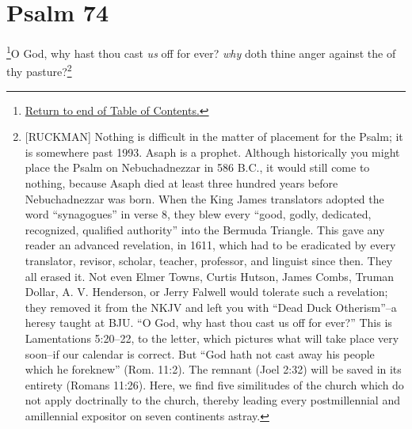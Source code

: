 \chapter{Psalm 74}
\footnote{\textcolor[rgb]{0.00,0.25,0.00}{\hyperlink{TOC}{Return to end of Table of Contents.}}}\textcolor[rgb]{0.00,0.00,1.00}{O God, why hast thou cast \emph{us} off for ever? \emph{why} doth thine anger  against the  of thy pasture?}\footnote{[RUCKMAN] Nothing is difficult in the matter of placement for the Psalm; it is somewhere past 1993. Asaph is a prophet. Although historically you might place the Psalm on Nebuchadnezzar in 586 B.C., it would still come to nothing, because Asaph died at least three hundred years before Nebuchadnezzar was born.  When the King James translators adopted the word “synagogues” in verse 8, they blew every “good, godly, dedicated, recognized, qualified authority” into the Bermuda Triangle. This gave any reader an advanced revelation, in 1611, which had to be eradicated by every translator, revisor, scholar, teacher, professor, and linguist since then. They all erased it. Not even Elmer Towns, Curtis Hutson, James Combs, Truman Dollar, A. V. Henderson, or Jerry Falwell would tolerate such a revelation; they removed it from the NKJV and left you with “Dead Duck Otherism”--a heresy taught at BJU. “O God, why hast thou cast us off for ever?” This is Lamentations 5:20--22, to the letter, which pictures what will take place very soon--if our calendar is correct. But “God hath not cast away his people which he foreknew” (Rom. 11:2). The remnant (Joel 2:32) will be saved in its entirety (Romans 11:26). Here, we find five similitudes of the church which do not apply doctrinally to the church, thereby leading every postmillennial and amillennial expositor on seven continents astray.
}
